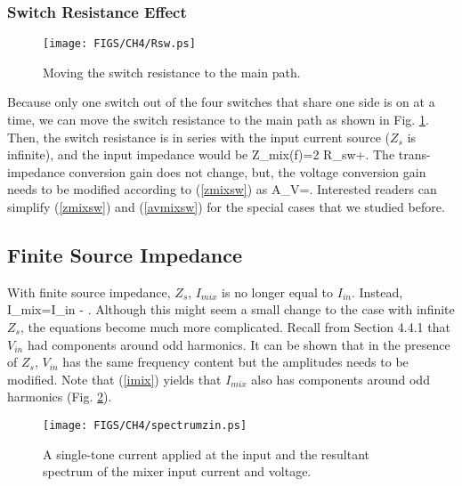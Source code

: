 \subsubsection{Switch Resistance Effect}
\begin{figure}[htb!]
\centering
\texttt{[image: FIGS/CH4/Rsw.ps]}
\caption{Moving the switch resistance to the main path.}
\label{fig:rsw}
\end{figure}
Because only one switch out of the four switches that share one side is on at a time, we can move the switch resistance to the main path as shown in
Fig. \ref{fig:rsw}. 
Then, the switch resistance is in series with the input current source ($Z_s$ is infinite), and the input impedance would be
\beq
Z_{mix}(f)=2 R_{sw}+ .
\label{zmixsw}
\eeq
The trans-impedance conversion gain does not change, but, the voltage conversion gain needs to be modified according to (\ref{zmixsw}) as
\beq
A_V=.
\label{avmixsw}
\eeq
Interested readers can simplify (\ref{zmixsw}) and (\ref{avmixsw}) for the special cases that we studied before.




\subsection{Finite Source Impedance}
With finite source impedance, $Z_s$, $I_{mix}$ is no longer equal to $I_{in}$. Instead,
\beq
I_{mix}=I_{in} - .
\label{imix}
\eeq
Although this might seem a small change to the case with infinite $Z_s$, the equations become much more complicated. Recall from Section 4.4.1 that
$V_{in}$ had components around odd harmonics. It can be shown that in the presence of $Z_s$, $V_{in}$ has the same frequency content but the
amplitudes needs to be modified. Note that (\ref{imix}) yields that $I_{mix}$ also has components around odd harmonics (Fig. \ref{fig:spectrumzin}).
\begin{figure}[htb!]
\centering
\texttt{[image: FIGS/CH4/spectrumzin.ps]}
\caption{A single-tone current applied at the input and the resultant spectrum of the mixer input current and voltage.}
\label{fig:spectrumzin}
\end{figure}

